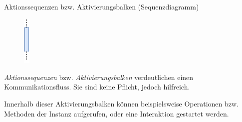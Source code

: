 \begin{diag}{Aktionssequenzen bzw. Aktivierungsbalken (Sequenzdiagramm)}
    \begin{figure}
        \centering
        \includegraphics[width=0.025\textwidth]{includes/figures/defi_diagrams_sequenz_aktion.pdf}
    \end{figure}
    \emph{Aktionssequenzen} bzw. \emph{Aktivierungsbalken} verdeutlichen einen Kommunikationsfluss.
    Sie sind keine Pflicht, jedoch hilfreich.

    Innerhalb dieser Aktivierungsbalken können beispielsweise Operationen bzw. Methoden der Instanz aufgerufen, oder eine Interaktion gestartet werden.

    \vspace{1cm}
\end{diag}

